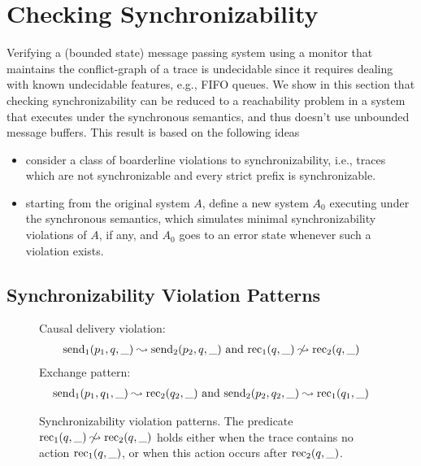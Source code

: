 \section{Checking Synchronizability}


Verifying a (bounded state) message passing system using a monitor that maintains the conflict-graph of a trace 
is undecidable since it requires dealing with known undecidable features, e.g., FIFO queues.
We show in this section that checking synchronizability can be reduced 
to a reachability problem in a system that executes under the synchronous semantics, and 
thus doesn't use unbounded message buffers. This result is based on the following ideas
\begin{itemize}
	\item consider a class of boarderline violations to synchronizability, i.e., traces which
are not synchronizable and every strict prefix is synchronizable.
	\item starting from the original system $A$, define a new system $A_0$ executing under
the synchronous semantics, which simulates minimal synchronizability violations of
$A$, if any, and $A_0$ goes to an error state whenever such a violation exists.
\end{itemize}

\subsection{Synchronizability Violation Patterns}


\begin{figure}[t]
Causal delivery violation:
\begin{align*}
\mathrm{send}_{1}({p_1,q,\_})\leadsto \mathrm{send}_{2}({p_2,q,\_})\mbox{ and }
  \mathrm{rec}_{1}({q,\_}) \not \leadsto \mathrm{rec}_{2}({q,\_})  
\end{align*}
Exchange pattern:
\begin{align*}
\mathrm{send}_{1}({p_1,q_1,\_})\leadsto \mathrm{rec}_{2}({q_2,\_})\mbox{ and }
\mathrm{send}_{2}({p_2,q_2,\_})\leadsto \mathrm{rec}_{1}({q_1,\_})
\end{align*}
\caption{Synchronizability violation patterns. The predicate $\mathrm{rec}_{1}({q,\_}) \not \leadsto \mathrm{rec}_{2}({q,\_}) $ holds either when the trace contains no action $\mathrm{rec}_{1}({q,\_})$, or when this action occurs after $\mathrm{rec}_{2}({q,\_}) $.}
\label{fig:patterns}
\end{figure}

